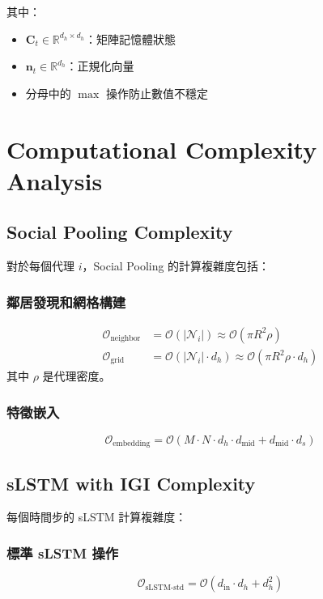 \documentclass[11pt,a4paper]{article}
\begin{document}
其中：
\begin{itemize}
\item $\mathbf{C}_t \in \mathbb{R}^{d_h \times d_h}$：矩陣記憶體狀態
\item $\mathbf{n}_t \in \mathbb{R}^{d_h}$：正規化向量
\item 分母中的 $\max$ 操作防止數值不穩定
\end{itemize}

\section{Computational Complexity Analysis}

\subsection{Social Pooling Complexity}

對於每個代理 $i$，Social Pooling 的計算複雜度包括：

\subsubsection{鄰居發現和網格構建}
\begin{align}
\mathcal{O}_{\text{neighbor}} &= \mathcal{O}(|\mathcal{N}_i|) \approx \mathcal{O}(\pi R^2 \rho) \\
\mathcal{O}_{\text{grid}} &= \mathcal{O}(|\mathcal{N}_i| \cdot d_h) \approx \mathcal{O}(\pi R^2 \rho \cdot d_h)
\end{align}
其中 $\rho$ 是代理密度。

\subsubsection{特徵嵌入}
\begin{equation}
\mathcal{O}_{\text{embedding}} = \mathcal{O}(M \cdot N \cdot d_h \cdot d_{\text{mid}} + d_{\text{mid}} \cdot d_s)
\end{equation}

\subsection{sLSTM with IGI Complexity}

每個時間步的 sLSTM 計算複雜度：

\subsubsection{標準 sLSTM 操作}
\begin{equation}
\mathcal{O}_{\text{sLSTM-std}} = \mathcal{O}(d_{\text{in}} \cdot d_h + d_h^2)
\end{equation}
\end{document}
